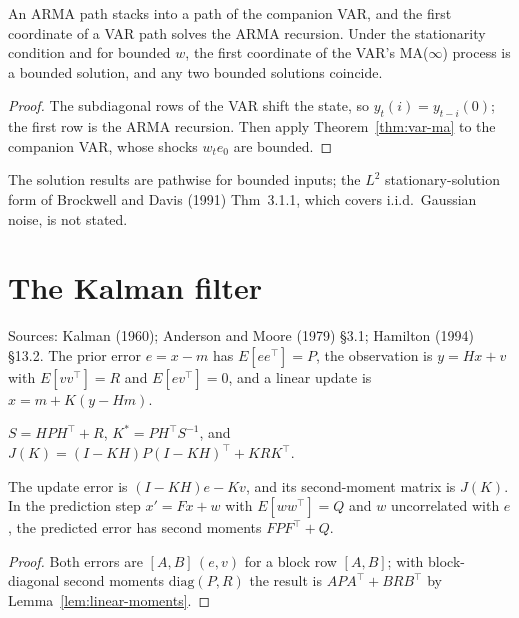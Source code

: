 \begin{theorem}
\label{thm:arma-ma}
\leanok
{}
An ARMA path stacks into a path of the companion VAR, and the first coordinate of a VAR path solves the ARMA
recursion. Under the stationarity condition and for bounded $w$, the first coordinate of the VAR's MA($\infty$) process
is a bounded solution, and any two bounded solutions coincide.
\end{theorem}
\begin{proof}
\leanok
The subdiagonal rows of the VAR shift the state, so $y_t(i) = y_{t-i}(0)$; the first row is the ARMA recursion. Then
apply Theorem~\ref{thm:var-ma} to the companion VAR, whose shocks $w_te_0$ are bounded.
\end{proof}

The solution results are pathwise for bounded inputs; the $L^2$ stationary-solution form of Brockwell and Davis
(1991) Thm~3.1.1, which covers i.i.d.\ Gaussian noise, is not stated.

\section{The Kalman filter}
\label{sec:kalman}

Sources: Kalman (1960); Anderson and Moore (1979) \S3.1; Hamilton (1994) \S13.2. The prior error $e = x - m$ has
$E[ee^\top] = P$, the observation is $y = Hx + v$ with $E[vv^\top] = R$ and $E[ev^\top] = 0$, and a linear update is
$\hat x = m + K(y - Hm)$.

\begin{definition}
\label{def:kalman}
\leanok
$S = HPH^\top + R$, $K^* = PH^\top S^{-1}$, and $J(K) = (I-KH)P(I-KH)^\top + KRK^\top$.
\end{definition}

\begin{theorem}
\label{thm:kalman-joseph}
\leanok
{}
The update error is $(I-KH)e - Kv$, and its second-moment matrix is $J(K)$. In the prediction step $x' = Fx + w$ with
$E[ww^\top] = Q$ and $w$ uncorrelated with $e$, the predicted error has second moments $FPF^\top + Q$.
\end{theorem}
\begin{proof}
\leanok
Both errors are $[A, B]\,(e, v)$ for a block row $[A,B]$; with block-diagonal second moments
$\mathrm{diag}(P, R)$ the result is $APA^\top + BRB^\top$ by Lemma~\ref{lem:linear-moments}.
\end{proof}

